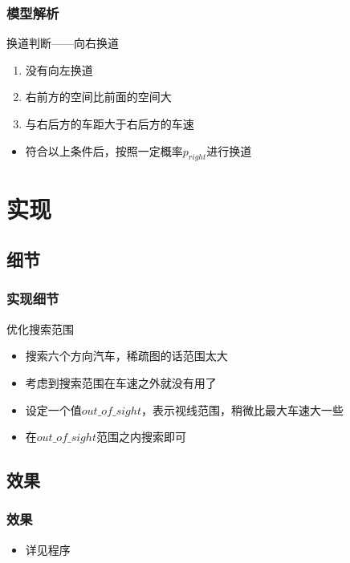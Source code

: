 \documentclass{beamer}
\begin{document}
	\begin{frame}
		\frametitle{模型解析}
		\begin{block}{换道判断——向右换道}
			\begin{enumerate}[{Condition} 1.]
				\item<2-> 没有向左换道
				\item<3-> 右前方的空间比前面的空间大
				\item<4-> 与右后方的车距大于右后方的车速
			\end{enumerate}
			\begin{itemize}
				\item<5-> 符合以上条件后，按照一定概率$p_{right}$进行换道
			\end{itemize}
		\end{block}
	\end{frame}
	
	\section{实现}
	
	\subsection{细节}
	
	\begin{frame}
		\frametitle{实现细节}
		\begin{block}{优化搜索范围}
			\begin{itemize}
				\item<2-> 搜索六个方向汽车，稀疏图的话范围太大
				\item<3-> 考虑到搜索范围在车速之外就没有用了
				\item<4-> 设定一个值$out\_of\_sight$，表示视线范围，稍微比最大车速大一些
				\item<5-> 在$out\_of\_sight$范围之内搜索即可
			\end{itemize}
		\end{block}
	\end{frame}
	
	\subsection{效果}
	
	\begin{frame}
		\frametitle{效果}
		\begin{block}{}
			\begin{itemize}
				\item 详见程序
			\end{itemize}
		\end{block}
	\end{frame}
	
\end{document}
